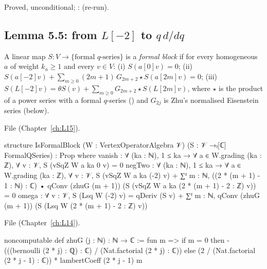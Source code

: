 \begin{status}
Proved, unconditional; : \lean{[propext, Classical.}\allowbreak{}\allowbreak\lean{sound]} (re-run).
\end{status}

\subsection{Lemma 5.5: from $L[-2]$ to $q\,d/dq$}

\begin{definition}\label{l16:def:formalblock}
A linear map $S:V\to\{\text{formal }q\text{-series}\}$ is a \emph{formal block} if for every homogeneous $a$ of weight
$k_a\ge1$ and every $v\in V$:
(i) $S(a[0]v) = 0$;
(ii) $S(a[-2]v) + \sum_{m\ge0}(2m+1)\,G_{2m+2}\star S(a[2m]v) = 0$;
(iii) $S(L[-2]v) = \theta S(v) + \sum_{m\ge0}G_{2m+2}\star S(L[2m]v)$,
where $\star$ is the product of a power series with a formal $q$-series () and $G_{2j}$ is Zhu's normalised
Eisenstein series (below).
\end{definition}
\noindent File  (Chapter~\ref{ch:L15}).
\begin{leancode}
structure IsFormalBlock (W : VertexOperatorAlgebra 𝒱) (S : 𝒱 →ₗ[ℂ] FormalQSeries) : Prop where
  vanish : ∀ (ka : ℕ), 1 ≤ ka → ∀ a ∈ W.grading (ka : ℤ), ∀ v : 𝒱, S (vSqZ W a ka 0 v) = 0
  negTwo : ∀ (ka : ℕ), 1 ≤ ka → ∀ a ∈ W.grading (ka : ℤ), ∀ v : 𝒱,
    S (vSqZ W a ka (-2) v)
      + ∑ᶠ m : ℕ, ((2 * (m + 1) - 1 : ℕ) : ℂ)
          • qConv (zhuG (m + 1)) (S (vSqZ W a ka (2 * (m + 1) - 2 : ℤ) v)) = 0
  omega : ∀ v : 𝒱, S (Lsq W (-2) v)
    = qDeriv (S v) + ∑ᶠ m : ℕ, qConv (zhuG (m + 1)) (S (Lsq W (2 * (m + 1) - 2 : ℤ) v))
\end{leancode}
\noindent File  (Chapter~\ref{ch:L14}).
\begin{leancode}
noncomputable def zhuG (j : ℕ) : ℕ → ℂ :=
  fun m =>
    if m = 0 then -(((bernoulli (2 * j) : ℚ) : ℂ) / (Nat.factorial (2 * j) : ℂ))
    else (2 / (Nat.factorial (2 * j - 1) : ℂ)) * lambertCoeff (2 * j - 1) m
\end{leancode}

